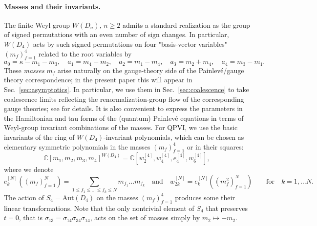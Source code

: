 \documentclass[12pt,a4paper]{article}
\numberwithin{equation}{section}
\begin{document}
\paragraph{Masses and their invariants.}
The finite Weyl group $W(D_n), \, n\geq2$ admits a standard realization as the group of signed permutations with an even number of sign changes. In particular, $W(D_4)$ acts by such signed permutations on four "basis-vector variables" $(m_f)_{f=1}^4$ related to the root variables by
\begin{equation}\label{PVI_masses}
a_0=\kappa{-}m_1{-}m_3, \quad a_1=m_4{-}m_2,
\quad a_2=m_1{-}m_4, \quad a_3=m_2{+}m_4,
\quad a_4=m_3{-}m_1.
\end{equation}
These \textit{masses} $m_f$ arise naturally on the gauge-theory side of the Painlev\'e/gauge theory correspondence; in the present paper this will appear in Sec.~\ref{sec:asymptotics}. In particular, we use them in Sec.~\ref{sec:coalescence} to take coalescence limits reflecting the renormalization-group flow of the corresponding gauge theories; see \cite[Sec. 5]{BST25} for details. 
It is also convenient to express the parameters in the Hamiltonian and tau forms of the (quantum) Painlev\'e equations in terms of Weyl-group invariant combinations of the masses. 
For QPVI, we use the basic invariants of the ring of $W(D_4)$-invariant polynomials, which can be chosen as elementary symmetric polynomials in the masses $(m_f)_{f=1}^4$ or in their squares:
\begin{equation}
\mathbb{C}[m_1,m_2,m_3,m_4]^{W(D_4)}=\mathbb{C}\left[w_2^{[4]},w_4^{[4]},e_4^{[4]},w_6^{[4]}\right],    
\end{equation}
where we denote
\begin{equation}\label{elem_def}
e_k^{[N]}\left((m_f)_{f=1}^{N}\right)=\sum_{1\leq f_1\leq \ldots \leq f_k\leq N}m_{f_1} \ldots m_{f_k} \quad \textrm{and} \quad w_{2k}^{[N]}=e_k^{[N]}\left((m_f^2)_{f=1}^N\right) \qquad \textrm{for} \quad k=1,\ldots N. 
\end{equation}
The action of $S_4=\mathrm{Aut}(D_4)$ on the masses $(m_f)_{f=1}^4$ produces some their linear transformations. Note that the only nontrivial element of $S_4$ that preserves $t=0$, that is $\sigma_{13}=\sigma_{14}\sigma_{34}\sigma_{14}$, acts on the set of masses simply by $m_2\mapsto-m_2$.
\end{document}
